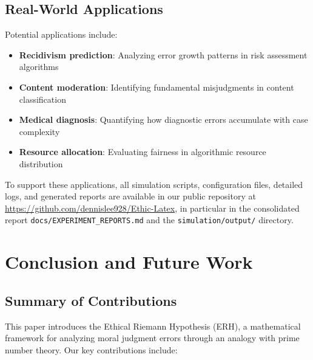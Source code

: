 \documentclass[12pt,a4paper]{article}
\theoremstyle{definition}
\theoremstyle{remark}
\begin{document}
\subsection{Real-World Applications}

Potential applications include:
\begin{itemize}
    \item \textbf{Recidivism prediction}: Analyzing error growth patterns in risk assessment algorithms
    \item \textbf{Content moderation}: Identifying fundamental misjudgments in content classification
    \item \textbf{Medical diagnosis}: Quantifying how diagnostic errors accumulate with case complexity
    \item \textbf{Resource allocation}: Evaluating fairness in algorithmic resource distribution
\end{itemize}

To support these applications, all simulation scripts, configuration files, detailed logs, and generated reports are available in our public repository at \url{https://github.com/dennislee928/Ethic-Latex}, in particular in the consolidated report \texttt{docs/EXPERIMENT\_REPORTS.md} and the \texttt{simulation/output/} directory.

\section{Conclusion and Future Work}
\label{sec:conclusion}

\subsection{Summary of Contributions}

This paper introduces the Ethical Riemann Hypothesis (ERH), a mathematical framework for analyzing moral judgment errors through an analogy with prime number theory. Our key contributions include:
\end{document}

